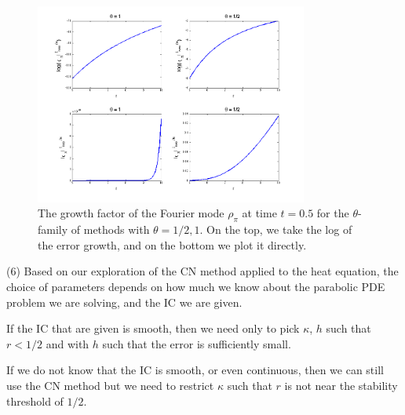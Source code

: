 \documentclass[11pt]{article}
\begin{document}
\begin{enumerate}
\begin{figure}[h!]
  \centering
    \includegraphics[width=0.8\textwidth]{andy_hw13_prb05_05.png}
  \caption{The growth factor of the Fourier mode $\rho _\pi$ at time $t = 0.5$ for the $\theta$-family of methods with $\theta = 1/2,1$.
           On the top, we take the log of the error growth, and on the bottom we plot it directly.}
\end{figure}

(6) Based on our exploration of the CN method applied to the heat equation, the choice of parameters depends on how much we know about the parabolic PDE problem we are solving, and the IC we are given.

If the IC that are given is smooth, then we need only to pick $\kappa$, $h$ such that $r<1/2$ and with $h$ such that the error is sufficiently small.

If we do not know that the IC is smooth, or even continuous, then we can still use the CN method but we need to restrict $\kappa$ such that $r$ is not near the stability threshold of $1/2$.


\end{enumerate}
\end{document}
